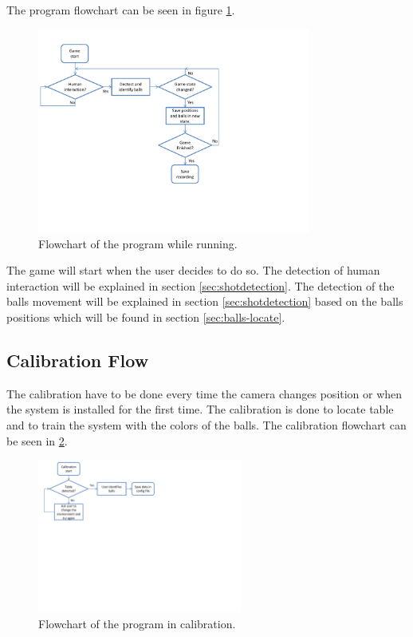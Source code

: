 The program flowchart can be seen in figure \ref{fig:program_flowchart}.

\begin{figure}[htpb]
\begin{center}
\leavevmode
\includegraphics[width=0.8\textwidth]{images/program_flowchart}
\end{center}
\caption{Flowchart of the program while running.}
\label{fig:program_flowchart}
\end{figure}

The game will start when the user decides to do so. The detection of human interaction will be explained in section \ref{sec:shotdetection}. The detection of the balls movement will be explained in section \ref{sec:shotdetection} based on the balls positions which will be found in section \ref{sec:balls-locate}.

\subsection{Calibration Flow}
The calibration have to be done every time the camera changes position or when the system is installed for the first time. The calibration is done to locate table and to train the system with the colors of the balls. The calibration flowchart can be seen in \ref{fig:calib_flowchart}.

\begin{figure}[htpb]
\begin{center}
\leavevmode
\includegraphics[width=0.6\textwidth]{images/calib_flowchart}
\end{center}
\caption{Flowchart of the program in calibration.}
\label{fig:calib_flowchart}
\end{figure}

